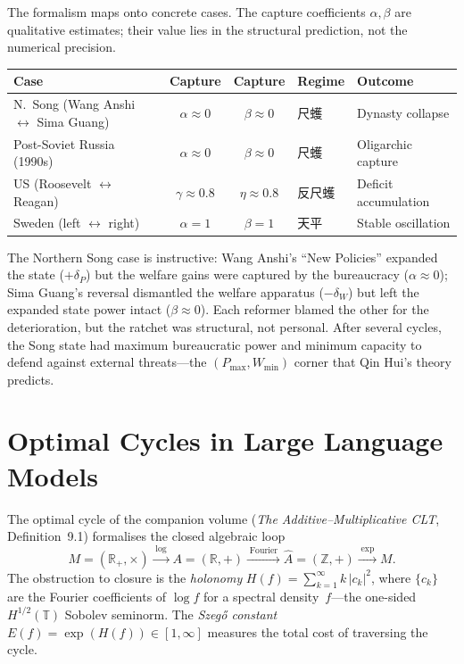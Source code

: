 \documentclass[11pt,a4paper]{article}
\theoremstyle{definition}
\theoremstyle{remark}
\begin{document}
The formalism maps onto concrete cases.
The capture coefficients $\alpha, \beta$ are qualitative estimates;
their value lies in the structural prediction, not the numerical
precision.

\begin{center}
\small
\begin{tabular}{@{}lccll@{}}
\toprule
\textbf{Case} & \textbf{Capture} & \textbf{Capture}
  & \textbf{Regime} & \textbf{Outcome} \\
\midrule
N.~Song (Wang Anshi $\leftrightarrow$ Sima Guang)
  & $\alpha \approx 0$ & $\beta \approx 0$ & 尺蠖 & Dynasty collapse \\
Post-Soviet Russia (1990s)
  & $\alpha \approx 0$ & $\beta \approx 0$ & 尺蠖 & Oligarchic capture \\
US (Roosevelt $\leftrightarrow$ Reagan)
  & $\gamma \approx 0.8$ & $\eta \approx 0.8$ & 反尺蠖 & Deficit accumulation \\
Sweden (left $\leftrightarrow$ right)
  & $\alpha = 1$ & $\beta = 1$ & 天平 & Stable oscillation \\
\bottomrule
\end{tabular}
\end{center}

\noindent
The Northern Song case is instructive:
Wang Anshi's ``New Policies'' expanded the state ($+\delta_P$) but
the welfare gains were captured by the bureaucracy ($\alpha \approx 0$);
Sima Guang's reversal dismantled the welfare apparatus ($-\delta_W$)
but left the expanded state power intact ($\beta \approx 0$).
Each reformer blamed the other for the deterioration, but the
ratchet was structural, not personal.
After several cycles, the Song state had maximum bureaucratic power
and minimum capacity to defend against external threats---the
$(P_{\max}, W_{\min})$ corner that Qin Hui's theory predicts.


\section{Optimal Cycles in Large Language Models}\label{sec:oc-llm}

The optimal cycle of the companion volume
(\textit{The Additive--Multiplicative CLT}, Definition~9.1)
formalises the closed algebraic loop
\[
  M = (\mathbb{R}_+, \times)
  \xrightarrow{\;\log\;}
  A = (\mathbb{R}, +)
  \xrightarrow{\;\text{Fourier}\;}
  \widehat{A} = (\mathbb{Z}, +)
  \xrightarrow{\;\exp\;}
  M.
\]
The obstruction to closure is the \emph{holonomy}
$H(f) = \sum_{k=1}^\infty k\,|c_k|^2$,
where $\{c_k\}$ are the Fourier coefficients of $\log f$ for a
spectral density~$f$---the one-sided $H^{1/2}(\mathbb{T})$ Sobolev
seminorm.
The \emph{Szeg\H{o} constant} $E(f) = \exp(H(f)) \in [1,\infty]$
measures the total cost of traversing the cycle.
\end{document}
